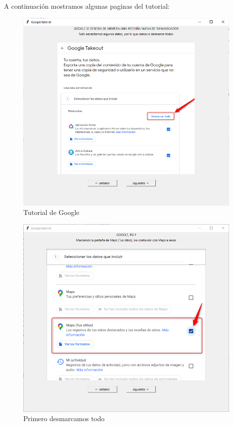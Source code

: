 A continuación mostramos algunas paginas del tutorial:
\begin{figure}
	\begin{center}
		\includegraphics[scale=0.5]{Imagenes/Fuentes/TutorialDescargaG2.png} \caption{Tutorial de Google}
		\label{TutorialDescargaG2}
	\end{center}
\end{figure}
\begin{figure}
	\begin{center}
		\includegraphics[scale=0.5]{Imagenes/Fuentes/TutorialDescargaG3.png} \caption{Primero desmarcamos todo}
		\label{TutorialDescargaG3}
	\end{center}
\end{figure}

